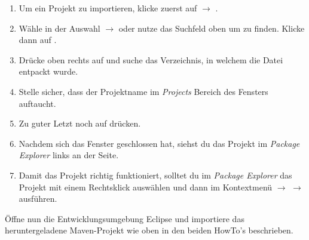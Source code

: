 \begin{Infobox}
    \begin{enumerate}[label=\arabic*.]
        \item Um ein Projekt zu importieren, klicke zuerst auf  $\to$ .
        \item Wähle in der Auswahl  $\to$  oder nutze das Suchfeld oben um  zu finden. Klicke dann auf .
        \item Drücke oben rechts auf  und suche das Verzeichnis, in welchem die Datei \jvkpackage { }entpackt wurde.
        \item Stelle sicher, dass der Projektname im \textit{Projects} Bereich des Fensters auftaucht.
        \item Zu guter Letzt noch auf  drücken.
        \item Nachdem sich das Fenster geschlossen hat, siehst du das Projekt im \textit{Package Explorer} links an der Seite.
        \item Damit das Projekt richtig funktioniert, solltet du im \textit{Package Explorer} das Projekt mit einem Rechtsklick auswählen und dann im Kontextmenü  $\to$  $\to$  ausführen.
    \end{enumerate}
\end{Infobox}


\newpage

Öffne nun die Entwicklungsumgebung Eclipse und importiere das heruntergeladene Maven-Projekt \jvkpackage { } wie oben in den beiden HowTo's beschrieben.

